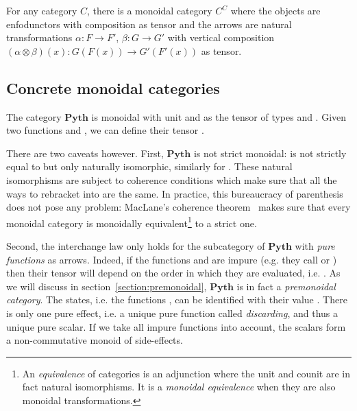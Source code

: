 \begin{example}\label{example:endofunctors are monoidal}
For any category $C$, there is a monoidal category $C^C$ where the objects are enfodunctors with composition as tensor and the arrows are natural transformations $\alpha : F \to F'$, $\beta : G \to G'$ with vertical composition $(\alpha \otimes \beta)(x) : G(F(x)) \to G'(F'(x))$ as tensor.
\end{example}

\subsection{Concrete monoidal categories}

\begin{example}
The category $\mathbf{Pyth}$ is monoidal with unit \py{()} and  as the tensor of types  and .
Given two functions  and , we can define their tensor .

There are two caveats however.
First, $\mathbf{Pyth}$ is not strict monoidal:  is not strictly equal to  but only naturally isomorphic, similarly for .
These natural isomorphisms are subject to coherence conditions which make sure that all the ways to rebracket  into  are the same.
In practice, this bureaucracy of parenthesis does not pose any problem: MacLane's coherence theorem~\cite[VII]{MacLane71} makes sure that every monoidal category is monoidally equivalent\footnote
{An \emph{equivalence} of categories is an adjunction where the unit and counit are in fact natural isomorphisms.
It is a \emph{monoidal equivalence} when they are also monoidal transformations.} to a strict one.

Second, the interchange law only holds for the subcategory of $\mathbf{Pyth}$ with \emph{pure functions} as arrows.
Indeed, if the functions  and  are impure (e.g. they call  or ) then their tensor  will depend on the order in which they are evaluated, i.e. .
As we will discuss in section~\ref{section:premonoidal}, $\mathbf{Pyth}$ is in fact a \emph{premonoidal category}.
The states, i.e. the functions , can be identified with their value .
There is only one pure effect, i.e. a unique pure function  called \emph{discarding}, and thus a unique pure scalar.
If we take all impure functions into account, the scalars form a non-commutative monoid of side-effects.
\end{example}


